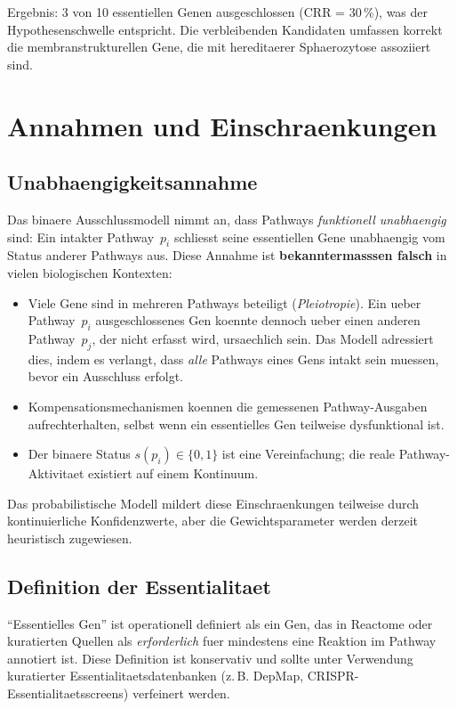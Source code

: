 \documentclass[12pt,a4paper]{article}
\begin{document}
Ergebnis: 3 von 10 essentiellen Genen ausgeschlossen (CRR = 30\,\%), was der Hypothesenschwelle entspricht. Die verbleibenden Kandidaten umfassen korrekt die membranstrukturellen Gene, die mit hereditaerer Sphaero\-zytose assoziiert sind.

\section*{Annahmen und Einschraenkungen}
\label{de:sec:limitations}

\subsection*{Unabhaengigkeitsannahme}

Das binaere Ausschlussmodell nimmt an, dass Pathways \emph{funktionell unabhaengig} sind: Ein intakter Pathway~$p_i$ schliesst seine essentiellen Gene unabhaengig vom Status anderer Pathways aus. Diese Annahme ist \textbf{bekanntermasssen falsch} in vielen biologischen Kontexten:

\begin{itemize}
    \item Viele Gene sind in mehreren Pathways beteiligt (\emph{Pleiotropie}). Ein ueber Pathway~$p_i$ ausgeschlossenes Gen koennte dennoch ueber einen anderen Pathway~$p_j$, der nicht erfasst wird, ursaechlich sein. Das Modell adressiert dies, indem es verlangt, dass \emph{alle} Pathways eines Gens intakt sein muessen, bevor ein Ausschluss erfolgt.
    \item Kompensationsmechanismen koennen die gemessenen Pathway-Ausgaben aufrechterhalten, selbst wenn ein essentielles Gen teilweise dysfunktional ist.
    \item Der binaere Status $s(p_i) \in \{0, 1\}$ ist eine Vereinfachung; die reale Pathway-Aktivitaet existiert auf einem Kontinuum.
\end{itemize}

Das probabilistische Modell mildert diese Einschraenkungen teilweise durch kontinuierliche Konfidenzwerte, aber die Gewichtsparameter werden derzeit heuristisch zugewiesen.

\subsection*{Definition der Essentialitaet}

"`Essentielles Gen"' ist operationell definiert als ein Gen, das in Reactome oder kuratierten Quellen als \emph{erforderlich} fuer mindestens eine Reaktion im Pathway annotiert ist. Diese Definition ist konservativ und sollte unter Verwendung kuratierter Essentialitaetsdatenbanken (z.\,B. DepMap, CRISPR-Essentialitaetsscreens) verfeinert werden.
\end{document}
